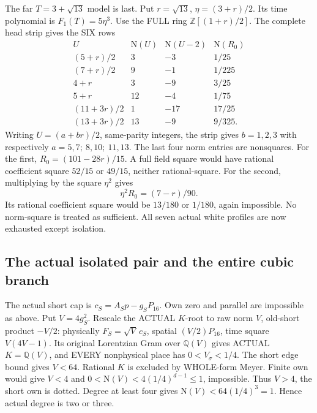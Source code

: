 The far \(T=3+\sqrt{13}\) model is last.
Put \(r=\sqrt{13}\), \(\eta=(3+r)/2\).
Its time polynomial is \(F_1(T)=5\eta^3\).
Use the FULL ring \(\mathbb Z[(1+r)/2]\).
The complete head strip gives the SIX rows
\[
\begin{array}{c|r|r|c}
 U&\mathrm N(U)&\mathrm N(U-2)&\mathrm N(R_0)\\ \hline
 (5+r)/2&3&-3&1/25\\
 (7+r)/2&9&-1&1/225\\
 4+r&3&-9&3/25\\
 5+r&12&-4&1/75\\
 (11+3r)/2&1&-17&17/25\\
 (13+3r)/2&13&-9&9/325 .
\end{array}
\]
Writing \(U=(a+br)/2\), same-parity integers,
the strip gives \(b=1,2,3\) with respectively
\(a=5,7;\ 8,10;\ 11,13\).
The last four norm entries are nonsquares.
For the first,
\(R_0=(101-28r)/15\).
A full field square would have rational coefficient
square \(52/15\) or \(49/15\), neither rational-square.
For the second, multiplying by the square \(\eta^2\)
gives
\[
                   \eta^2R_0=(7-r)/90 .
\]
Its rational coefficient square would be \(13/180\)
or \(1/180\), again impossible.
No norm-square is treated as sufficient.
All seven actual white profiles are now exhausted
except isolation.

\subsection{The actual isolated pair and the entire cubic branch}
\label{app:arithB16cubic}

The actual short cap is
\(c_S=A_Sp-g_SP_{16}\).
Own zero and parallel are impossible as above.
Put \(V=4g_S^2\).
Rescale the ACTUAL \(K\)-root to raw norm \(V\),
old-short product \(-V/2\):
physically \(F_S=\sqrt V\,c_S\), spatial
\((V/2)P_{16}\), time square \(V(4V-1)\).
Its original Lorentzian Gram over \(\mathbb Q(V)\)
gives ACTUAL \(K=\mathbb Q(V)\), and EVERY
nonphysical place has \(0<V_\sigma<1/4\).
The short edge bound gives \(V<64\).
Rational \(K\) is excluded by WHOLE-form Meyer.
Finite own would give \(V<4\) and
\(0<\mathrm N(V)<4(1/4)^{d-1}\le1\), impossible.
Thus \(V>4\), the short own is dotted.
Degree at least four gives
\(\mathrm N(V)<64(1/4)^3=1\).
Hence actual degree is two or three.

